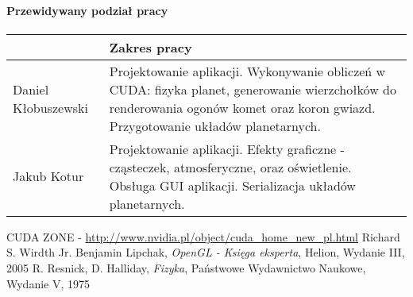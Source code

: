 \documentclass[a4paper,titlepage,10pt]{article}
\begin{document}
	\paragraph{Przewidywany podział pracy}

	\paragraph{}
	\begin{tabular}{|l|p{10cm}|}
	\hline
	~ & Zakres pracy \\\hline
	Daniel Kłobuszewski & Projektowanie aplikacji. Wykonywanie obliczeń w CUDA: fizyka planet, generowanie wierzchołków do renderowania ogonów komet oraz koron gwiazd. Przygotowanie układów planetarnych.\\\hline
	Jakub Kotur & Projektowanie aplikacji. Efekty graficzne - cząsteczek, atmosferyczne, oraz oświetlenie. Obsługa GUI aplikacji. Serializacja układów planetarnych.\\\hline
	\end{tabular}

	\fontsize{8}{6}\selectfont
	\begin{thebibliography}{0}
	 CUDA ZONE - \url{http://www.nvidia.pl/object/cuda\_home\_new\_pl.html}
		Richard S. Wirdth Jr. Benjamin Lipchak,
		\emph{OpenGL - Księga eksperta},
		Helion,
		Wydanie III,
		2005
		R. Resnick, D. Halliday,
		\emph{Fizyka},
		Państwowe Wydawnictwo Naukowe,
		Wydanie V,
		1975
	\end{thebibliography}

	\vfill
	\hspace{.6\textwidth} \makebox[.3\textwidth][l] {\hrulefill} 

	\hspace{.6\textwidth} 
\end{document}

